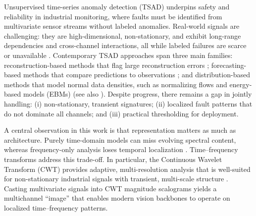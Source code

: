 \documentclass{article}
\begin{document}
Unsupervised time-series anomaly detection (TSAD) underpins safety and reliability in industrial monitoring, where faults must be identified from multivariate sensor streams without labeled anomalies. Real-world signals are challenging: they are high-dimensional, non-stationary, and exhibit long-range dependencies and cross-channel interactions, all while labeled failures are scarce or unavailable \citep{liu_2024_timeseries, boniol_2024_dive}. Contemporary TSAD approaches span three main families: reconstruction-based methods that flag large reconstruction errors \citep{malhotra_ramakrishnan_anand_vig_agarwal_shroff_2016, audibert_michiardi_guyard_marti_zuluaga_2020, tuli_casale_jennings_2022}; forecasting-based methods that compare predictions to observations \citep{munir_siddiqui_dengel_ahmed_2019, su_zhao_niu_liu_sun_pei_2019}; and distribution-based methods that model normal data densities, such as normalizing flows \citep{rezende_mohamed_2015, kingma2018glowgenerativeflowinvertible} and energy-based models (EBMs) \citep{du_mordatch_2019, yoon_jin_noh_park_2023} (see also \citet{pang_shen_cao_van_2021}). Despite progress, there remains a gap in jointly handling: (i) non-stationary, transient signatures; (ii) localized fault patterns that do not dominate all channels; and (iii) practical thresholding for deployment.

A central observation in this work is that representation matters as much as architecture. Purely time-domain models can miss evolving spectral content, whereas frequency-only analysis loses temporal localization \citep{oppenheim_lim_1981}. Time–frequency transforms address this trade-off. In particular, the Continuous Wavelet Transform (CWT) provides adaptive, multi-resolution analysis that is well-suited for non-stationary industrial signals with transient, multi-scale structure \citep{torrence_compo_1998, mallat_peyre_2009, rhif_ben_abbes_farah_martínez_sang_2019}. Casting multivariate signals into CWT magnitude scalograms yields a multichannel “image” that enables modern vision backbones to operate on localized time–frequency patterns.
\end{document}
